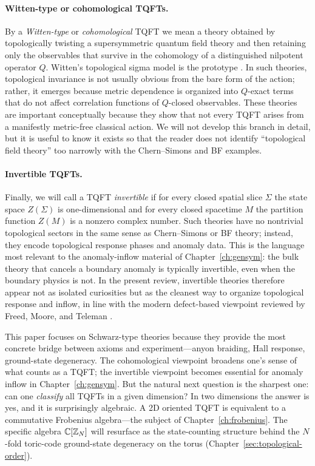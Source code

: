 \paragraph{Witten-type or cohomological TQFTs.}
By a \emph{Witten-type} or \emph{cohomological} TQFT we mean a theory obtained by topologically twisting a supersymmetric quantum field theory and then retaining only the observables that survive in the cohomology of a distinguished nilpotent operator $Q$. Witten's topological sigma model is the prototype \cite{Witten1988Sigma}. In such theories, topological invariance is not usually obvious from the bare form of the action; rather, it emerges because metric dependence is organized into $Q$-exact terms that do not affect correlation functions of $Q$-closed observables. These theories are important conceptually because they show that not every TQFT arises from a manifestly metric-free classical action. We will not develop this branch in detail, but it is useful to know it exists so that the reader does not identify ``topological field theory'' too narrowly with the Chern--Simons and BF examples.

\paragraph{Invertible TQFTs.}
Finally, we will call a TQFT \emph{invertible} if for every closed spatial slice $\Sigma$ the state space $Z(\Sigma)$ is one-dimensional and for every closed spacetime $M$ the partition function $Z(M)$ is a nonzero complex number. Such theories have no nontrivial topological sectors in the same sense as Chern--Simons or BF theory; instead, they encode topological response phases and anomaly data. This is the language most relevant to the anomaly-inflow material of Chapter~\ref{ch:gensym}: the bulk theory that cancels a boundary anomaly is typically invertible, even when the boundary physics is not. In the present review, invertible theories therefore appear not as isolated curiosities but as the cleanest way to organize topological response and inflow, in line with the modern defect-based viewpoint reviewed by Freed, Moore, and Teleman \cite{FreedMooreTeleman2024}.

\medskip

\noindent This paper focuses on Schwarz-type theories because they provide the most concrete bridge between axioms and experiment---anyon braiding, Hall response, ground-state degeneracy.  The cohomological viewpoint broadens one's sense of what counts as a TQFT; the invertible viewpoint becomes essential for anomaly inflow in Chapter~\ref{ch:gensym}.  But the natural next question is the sharpest one: can one \emph{classify} all TQFTs in a given dimension?  In two dimensions the answer is yes, and it is surprisingly algebraic.  A 2D oriented TQFT is equivalent to a commutative Frobenius algebra---the subject of Chapter~\ref{ch:frobenius}.  The specific algebra $\mathbb{C}[\mathbb{Z}_N]$ will resurface as the state-counting structure behind the $N$-fold toric-code ground-state degeneracy on the torus (Chapter~\ref{sec:topological-order}).
